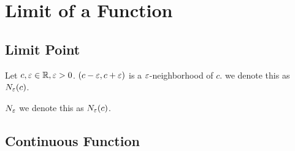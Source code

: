 
\newpage
\section{Limit of a Function}

\subsection{Limit Point}

\begin{definition}
  Let $c, \varepsilon \in \mathbb{R}, \varepsilon > 0$. $(c-\varepsilon, c+\varepsilon)$ is a $\varepsilon$-neighborhood
  of $c$. we denote this as $N_{\varepsilon}(c)$.
  \label{def:neighbor}
\end{definition}

\begin{definition}
  $N_{\varepsilon}$ we denote this as $N_{\varepsilon}(c)$.
  \label{def:neighbor_delete}
\end{definition}

\begin{definition}

  \label{def:limit_point}
\end{definition}

\begin{theorem}

  \label{thm:}
\end{theorem}




\subsection{Continuous Function}

\begin{definition}
  
  \label{def:continuous_function}
\end{definition}